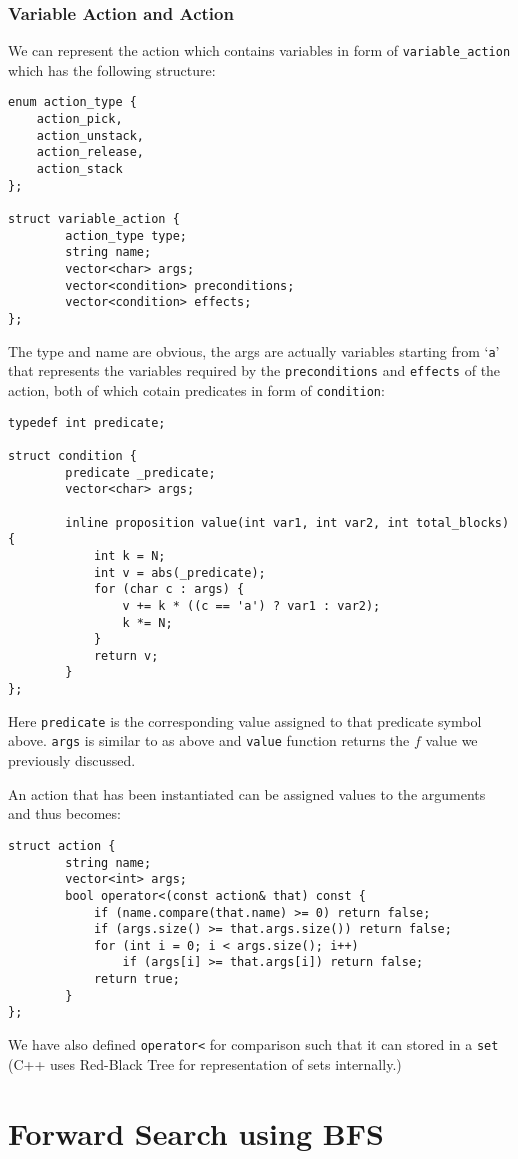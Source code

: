 \documentclass{article}
\begin{document}
\subsubsection{Variable Action and Action}
We can represent the action which contains variables in form of \verb|variable_action| which has the following structure:
\begin{lstlisting}
enum action_type {
	action_pick,
	action_unstack,
	action_release,
	action_stack
};

struct variable_action {
		action_type type;
		string name;
		vector<char> args;
		vector<condition> preconditions;
		vector<condition> effects;
};
\end{lstlisting}
The type and name are obvious, the args are actually variables starting from `\verb|a|' that represents the variables required by the \verb|preconditions| and \verb|effects| of the action, both of which cotain predicates in form of \verb|condition|:

\begin{lstlisting}
typedef int predicate;

struct condition {
		predicate _predicate;
		vector<char> args;

		inline proposition value(int var1, int var2, int total_blocks) {
			int k = N;
			int v = abs(_predicate);
			for (char c : args) {
				v += k * ((c == 'a') ? var1 : var2);
				k *= N;
			}
			return v;
		}
};
\end{lstlisting}
Here \verb|predicate| is the corresponding value assigned to that predicate symbol above. \verb|args| is similar to as above and \verb|value| function returns the $f$ value we previously discussed.

An action that has been instantiated can be assigned values to the arguments and thus becomes:
\begin{lstlisting}
struct action {
		string name;
		vector<int> args;
		bool operator<(const action& that) const {
			if (name.compare(that.name) >= 0) return false;
			if (args.size() >= that.args.size()) return false;
			for (int i = 0; i < args.size(); i++)
				if (args[i] >= that.args[i]) return false;
			return true;
		}
};
\end{lstlisting}
We have also defined \verb|operator<| for comparison such that it can stored in a \verb|set| (C++ uses Red-Black Tree for representation of sets internally.)

\section{Forward Search using BFS}
\end{document}
